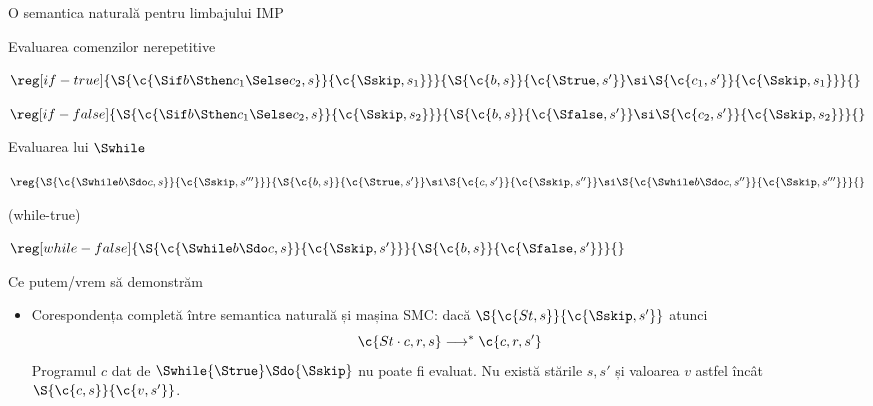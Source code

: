 \begin{section}{O semantica naturală pentru limbajului IMP}
\begin{frame}{Evaluarea comenzilor nerepetitive}
\begin{itemize}
\vitem[]
$\reg[if-true]{\S{\c{\Sif b \Sthen c_1 \Selse c_2,s}}{\c{\Sskip,s_1}}}{\S{\c{b,s}}{\c{\Strue, s'}}\si \S{\c{c_1,s'}}{\c{\Sskip, s_1}}}{}$

\vitem[]
$\reg[if-false]{\S{\c{\Sif b \Sthen c_1 \Selse c_2,s}}{\c{\Sskip,s_2}}}{\S{\c{b,s}}{\c{\Sfalse, s'}}\si \S{\c{c_2,s'}}{\c{\Sskip, s_2}}}{}$


\end{itemize}
\end{frame}

\begin{frame}{Evaluarea lui $\Swhile$}
\ 

\medskip\vfill
$\reg{\S{\c{\Swhile b \Sdo c,s}}{\c{\Sskip,s'''}}}{\S{\c{b,s}}{\c{\Strue, s'}}\si \S{\c{c,s'}}{\c{\Sskip, s''}}\si \S{\c{\Swhile b \Sdo c,s''}}{\c{\Sskip,s'''}}}{}$

\hfill ({\sc while-true})

\vfill
$\reg[while-false]{\S{\c{\Swhile b \Sdo c,s}}{\c{\Sskip,s'}}}{\S{\c{b,s}}{\c{\Sfalse, s'}}}{}$

\vfill
\end{frame}

\begin{frame}{Ce putem/vrem să demonstrăm}
\begin{itemize}
\item Corespondența completă între semantica naturală și mașina SMC: dacă $\S{\c{St, s}}{\c{\Sskip, s'}}$ atunci \[\c{St\cdot c, r, s} \longrightarrow^\ast \c{c, r, s'}\]
\vitem Programul $c$ dat de $\Swhile {\Strue} \Sdo {\Sskip}$ nu poate fi evaluat.  Nu există stările $s, s'$ și valoarea $v$ astfel încât $\S{\c{c,s}}{\c{v,s'}}$. 
\end{itemize}
\end{frame}


\end{section}
